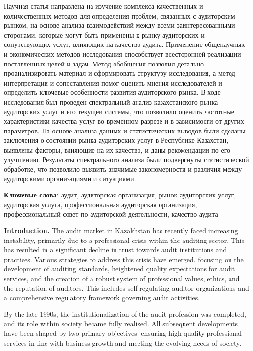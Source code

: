 Научная статья направлена на изучение комплекса качественных и
количественных методов для определения проблем, связанных с аудиторским
рынком, на основе анализа взаимодействий между всеми заинтересованными
сторонами, которые могут быть применены к рынку аудиторских и
сопутствующих услуг, влияющих на качество аудита. Применение общенаучных
и экономических методов исследования способствует всесторонней
реализации поставленных целей и задач. Метод обобщения позволил детально
проанализировать материал и сформировать структуру исследования, а метод
интерпретации и сопоставления помог оценить мнения исследователей и
определить ключевые особенности развития аудиторского рынка. В ходе
исследования был проведен спектральный анализ казахстанского рынка
аудиторских услуг и его текущей системы, что позволило оценить частотные
характеристики качества услуг во временном разрезе и в зависимости от
других параметров. На основе анализа данных и статистических выводов
были сделаны заключения о состоянии рынка аудиторских услуг в Республике
Казахстан, выявлены факторы, влияющие на их качество, и даны
рекомендации по его улучшению. Результаты спектрального анализа были
подвергнуты статистической обработке, что позволило выявить значимые
закономерности и различия между аудиторскими организациями и ситуациями.

\textbf{Ключевые слова:} аудит, аудиторская организация, рынок
аудиторских услуг, аудиторская услуга, профессиональная аудиторская
организация, профессиональный совет по аудиторской деятельности,
качество аудита

\textbf{Introduction.} The audit market in Kazakhstan has recently faced
increasing instability, primarily due to a professional crisis within
the auditing sector. This has resulted in a significant decline in trust
towards audit institutions and practices. Various strategies to address
this crisis have emerged, focusing on the development of auditing
standards, heightened quality expectations for audit services, and the
creation of a robust system of professional values, ethics, and the
reputation of auditors. This includes self-regulating auditor
organizations and a comprehensive regulatory framework governing audit
activities.

By the late 1990s, the institutionalization of the audit profession was
completed, and its role within society became fully realized. All
subsequent developments have been shaped by two primary objectives:
ensuring high-quality professional services in line with business growth
and meeting the evolving needs of society.

